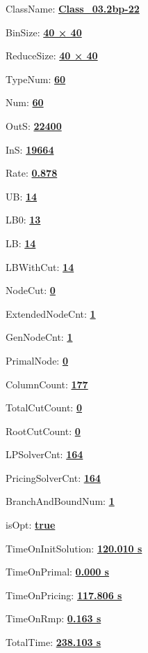 \documentclass[11pt]{article}
\begin{document}
\pagestyle{empty}


ClassName: \underline{\textbf{Class_03.2bp-22}}
\par
BinSize: \underline{\textbf{40 × 40}}
\par
ReduceSize: \underline{\textbf{40 × 40}}
\par
TypeNum: \underline{\textbf{60}}
\par
Num: \underline{\textbf{60}}
\par
OutS: \underline{\textbf{22400}}
\par
InS: \underline{\textbf{19664}}
\par
Rate: \underline{\textbf{0.878}}
\par
UB: \underline{\textbf{14}}
\par
LB0: \underline{\textbf{13}}
\par
LB: \underline{\textbf{14}}
\par
LBWithCut: \underline{\textbf{14}}
\par
NodeCut: \underline{\textbf{0}}
\par
ExtendedNodeCnt: \underline{\textbf{1}}
\par
GenNodeCnt: \underline{\textbf{1}}
\par
PrimalNode: \underline{\textbf{0}}
\par
ColumnCount: \underline{\textbf{177}}
\par
TotalCutCount: \underline{\textbf{0}}
\par
RootCutCount: \underline{\textbf{0}}
\par
LPSolverCnt: \underline{\textbf{164}}
\par
PricingSolverCnt: \underline{\textbf{164}}
\par
BranchAndBoundNum: \underline{\textbf{1}}
\par
isOpt: \underline{\textbf{true}}
\par
TimeOnInitSolution: \underline{\textbf{120.010 s}}
\par
TimeOnPrimal: \underline{\textbf{0.000 s}}
\par
TimeOnPricing: \underline{\textbf{117.806 s}}
\par
TimeOnRmp: \underline{\textbf{0.163 s}}
\par
TotalTime: \underline{\textbf{238.103 s}}
\par
\newpage


\end{document}
